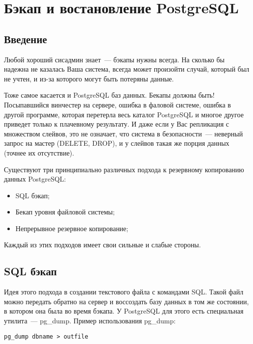 \chapter{Бэкап и востановление PostgreSQL}
\begin{epigraphs}
\end{epigraphs}
\section{Введение}
Любой хороший сисадмин знает~--- бэкапы нужны всегда. 
На сколько бы надежна не казалась Ваша система, всегда может произойти случай, который был не учтен, и из-за которого 
могут быть потеряны данные.

Тоже самое касается и PostgreSQL баз данных. Бекапы должны быть! Посыпавшийся винчестер на сервере, ошибка в фаловой системе, 
ошибка в другой программе, которая перетерла весь каталог PostgreSQL и многое другое приведет только к плачевному результату.
И даже если у Вас репликация с множеством слейвов, 
это не означает, что система в безопасности~--- неверный запрос на мастер (DELETE, DROP), и у слейвов такая же порция данных 
(точнее их отсутствие). 

Существуют три принципиально различных подхода к резервному копированию данных PostgreSQL:
\begin{itemize}
\item SQL бэкап;
\item Бекап уровня файловой системы;
\item Непрерывное резервное копирование;
\end{itemize}
Каждый из этих подходов имеет свои сильные и слабые стороны.


\section{SQL бэкап}
Идея этого подхода в создании текстового файла с командами SQL. Такой файл можно передать обратно на сервер 
и воссоздать базу данных в том же состоянии, в котором она была во время бэкапа. 
У PostgreSQL для этого есть специальная утилита~--- pg\_dump. Пример использования pg\_dump:
\begin{lstlisting}[label=lst:backups1,caption=Создаем бэкап с помощью pg\_dump]
pg_dump dbname > outfile
\end{lstlisting}

